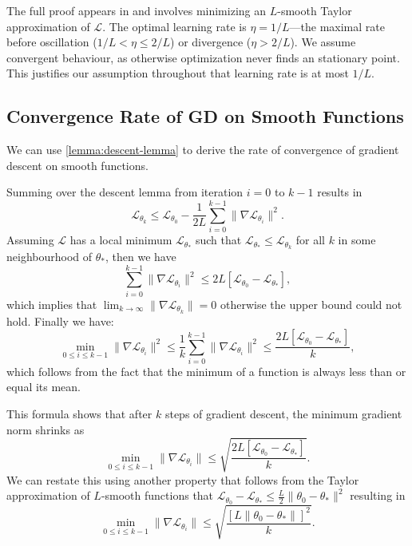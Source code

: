 \documentclass{article}
\theoremstyle{plain}
\theoremstyle{definition}
\theoremstyle{remark}
\begin{document}
The full proof appears in \citet{Wright_Recht_2022} and involves minimizing an $L$-smooth Taylor approximation of $\mathcal{L}$. The optimal learning rate is $\eta = 1/L$---the maximal rate before oscillation ($1/L < \eta \leq 2/L$) or divergence ($\eta > 2/L$). We assume convergent behaviour, as otherwise optimization never finds an stationary point. This justifies our assumption throughout that learning rate is at most $1/L$.

\subsection{Convergence Rate of GD on Smooth Functions}

We can use \cref{lemma:descent-lemma} to derive the rate of convergence of gradient descent on smooth functions. 

Summing over the descent lemma from iteration $i=0$ to $k-1$ results in \[
\mathcal{L}_{\theta_k} \leq \mathcal{L}_{\theta_0} - \frac{1}{2L} \sum_{i = 0}^{k - 1}  \|\nabla \mathcal{L}_{\theta_i}\|^2.
\]
Assuming $\mathcal{L}$ has a local minimum $\mathcal{L_{\theta_*}}$ such that \(
\mathcal{L_{\theta_*}} 
\leq \mathcal{L}_{\theta_k}
\) for all $k$ in some neighbourhood of $\theta_*$, then we have \[
\sum_{i = 0}^{k-1} \|\nabla \mathcal{L}_{\theta_i}\|^2 \leq 2L\left[\mathcal{L}_{\theta_0} - \mathcal{L}_{\theta_*}\right],
\] which implies that \(\lim_{k \to \infty} \|\nabla \mathcal{L}_{\theta_k}\| = 0\) otherwise the upper bound could not hold. Finally we have:
\[
\underset{0 \leq i \leq k-1}{\min} \|\nabla \mathcal{L}_{\theta_i}\|^2 
\leq 
\frac{1}{k} \sum_{i = 0}^{k-1} \|\nabla \mathcal{L}_{\theta_i}\|^2 
\leq  
    \frac{2L
        \left[ \mathcal{L}_{\theta_0} - \mathcal{L}_{\theta_*} \right] 
    }{k},
\] which follows from the fact that the minimum of a function is always less than or equal its mean.

This formula shows that after $k$ steps of gradient descent, the minimum gradient norm shrinks as 
\begin{equation*}
\underset{0 \leq i \leq k-1}{\min} \|\nabla \mathcal{L}_{\theta_i}\|
\leq  \sqrt{ 
    \frac{2L
        \left[ \mathcal{L}_{\theta_0} - \mathcal{L_{\theta_*}} \right] 
    }{k}
}.
\end{equation*}
We can restate this using another property that follows from the Taylor approximation of $L$-smooth functions that $\mathcal{L}_{\theta_0} - \mathcal{L}_{\theta_*} \leq \frac{L}{2}\|\theta_0 - \theta_*\|^2$ resulting in 
\begin{equation*}
\label{eq:sublinear-smooth-gd-convergence-rate}
\underset{0 \leq i \leq k-1}{\min} \|\nabla \mathcal{L}_{\theta_i}\|
\leq  \sqrt{ 
    \frac{
        \left[ L\|{\theta_0} - {\theta_*}\| \right]^2
    }{k}
}.
\end{equation*}
\end{document}
